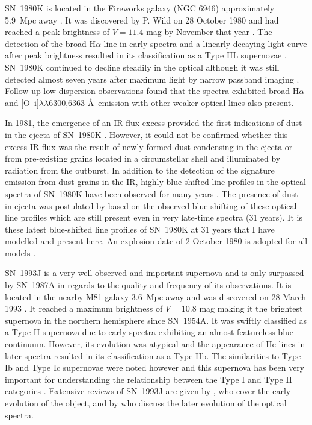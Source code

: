 SN~1980K is located in the Fireworks galaxy (NGC 6946) approximately 5.9~Mpc away \citep{Karachentsev2000}.  It was discovered by P. Wild on  28 October 1980 and  had reached a peak brightness of $V=11.4$ mag by November that year \citep{Buta1982}.   The detection of the broad H$\alpha$ line in early spectra and a linearly decaying light curve after peak brightness resulted in its classification as a Type IIL supernovae \citep{Barbon1982}.  SN~1980K continued to decline steadily in the optical although it was still detected almost seven years after maximum light by narrow passband imaging \citep{Fesen1988}.  Follow-up low dispersion observations found that the spectra exhibited broad H$\alpha$ and [O~{\sc i}]$\lambda\lambda$6300,6363 \AA\  emission with other weaker optical lines also present.  

In 1981, the emergence of an IR flux excess provided the first indications of dust in the ejecta of SN~1980K \citep{Dwek1983}.  However, it could not be confirmed whether this excess IR flux was the result of newly-formed dust condensing in the ejecta or from pre-existing grains located in a circumstellar shell and illuminated by radiation from the outburst.  In addition to the detection of the signature emission from dust grains in the IR, highly blue-shifted line profiles in the optical spectra of SN~1980K have been observed for many years \citep{Fesen1990,Fesen1994,Fesen1995,Fesen1999}.  The presence of dust in ejecta was postulated by \citet{Milisavljevic2012} based on the observed blue-shifting of these optical line profiles which are still present even in very late-time spectra (31 years). It is these latest blue-shifted line profiles of SN~1980K at 31 years that I have modelled and present here.  An explosion date of 2 October 1980 is adopted for all models \citep{Montes1998}.


SN~1993J is a very well-observed and important supernova and is only surpassed  by SN~1987A in regards to the quality and frequency of its observations.  It is located in the nearby M81 galaxy 3.6~Mpc away \citep{Freedman1994} and was discovered on 28 March 1993 \citep{Ripero1993}.  It reached a maximum brightness of $V=10.8$ mag making it the brightest supernova in the northern hemisphere since SN~1954A. It was swiftly classified as a Type II supernova due to early spectra exhibiting an almost featureless blue continuum.  However, its evolution was atypical and the appearance of He lines in later spectra resulted in its classification as a Type IIb.  The similarities to Type Ib and Type Ic supernovae were noted however and this supernova has been very important for understanding the relationship between the Type I and Type II categories \citep{Fillipenko1993,Garnavich1993}.  Extensive reviews of SN~1993J are given by \citet{Wheeler1996}, who cover the early evolution of the object, and by \citet{Matheson2000a,Matheson2000b} who discuss the later evolution of the optical spectra.  

